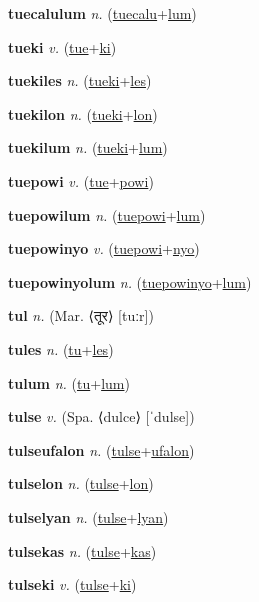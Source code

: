 \textbf{\hypertarget{tuecalulum}{tuecalulum}} \textit{n.} (\hyperlink{tuecalu}{tuecalu}+\allowbreak \hyperlink{lum}{lum})


\textbf{\hypertarget{tueki}{tueki}} \textit{v.} (\hyperlink{tue}{tue}+\allowbreak \hyperlink{ki}{ki})


\textbf{\hypertarget{tuekiles}{tuekiles}} \textit{n.} (\hyperlink{tueki}{tueki}+\allowbreak \hyperlink{les}{les})


\textbf{\hypertarget{tuekilon}{tuekilon}} \textit{n.} (\hyperlink{tueki}{tueki}+\allowbreak \hyperlink{lon}{lon})


\textbf{\hypertarget{tuekilum}{tuekilum}} \textit{n.} (\hyperlink{tueki}{tueki}+\allowbreak \hyperlink{lum}{lum})


\textbf{\hypertarget{tuepowi}{tuepowi}} \textit{v.} (\hyperlink{tue}{tue}+\allowbreak \hyperlink{powi}{powi})


\textbf{\hypertarget{tuepowilum}{tuepowilum}} \textit{n.} (\hyperlink{tuepowi}{tuepowi}+\allowbreak \hyperlink{lum}{lum})


\textbf{\hypertarget{tuepowinyo}{tuepowinyo}} \textit{v.} (\hyperlink{tuepowi}{tuepowi}+\allowbreak \hyperlink{nyo}{nyo})


\textbf{\hypertarget{tuepowinyolum}{tuepowinyolum}} \textit{n.} (\hyperlink{tuepowinyo}{tuepowinyo}+\allowbreak \hyperlink{lum}{lum})


\textbf{\hypertarget{tul}{tul}} \textit{n.} (Mar. ⟨{\devanagari{}तूर}⟩ [tuːr])


\textbf{\hypertarget{tules}{tules}} \textit{n.} (\hyperlink{tu}{tu}+\allowbreak \hyperlink{les}{les})


\textbf{\hypertarget{tulum}{tulum}} \textit{n.} (\hyperlink{tu}{tu}+\allowbreak \hyperlink{lum}{lum})


\textbf{\hypertarget{tulse}{tulse}} \textit{v.} (Spa. ⟨dulce⟩ [ˈdulse])


\textbf{\hypertarget{tulseufalon}{tulseufalon}} \textit{n.} (\hyperlink{tulse}{tulse}+\allowbreak \hyperlink{ufalon}{ufalon})


\textbf{\hypertarget{tulselon}{tulselon}} \textit{n.} (\hyperlink{tulse}{tulse}+\allowbreak \hyperlink{lon}{lon})


\textbf{\hypertarget{tulselyan}{tulselyan}} \textit{n.} (\hyperlink{tulse}{tulse}+\allowbreak \hyperlink{lyan}{lyan})


\textbf{\hypertarget{tulsekas}{tulsekas}} \textit{n.} (\hyperlink{tulse}{tulse}+\allowbreak \hyperlink{kas}{kas})


\textbf{\hypertarget{tulseki}{tulseki}} \textit{v.} (\hyperlink{tulse}{tulse}+\allowbreak \hyperlink{ki}{ki})


